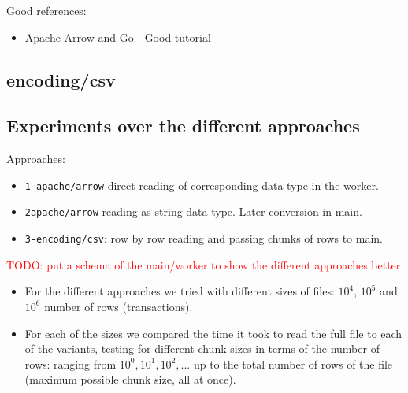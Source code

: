\documentclass{article}
\begin{document}
Good references:
\begin{itemize}
  \item \href{https://www.apachecon.com/acna2022/slides/01_Topol_Arrow_and_Go.pdf}{Apache Arrow and Go - Good tutorial}
\end{itemize}


\subsection{encoding/csv}

\subsection{Experiments over the different approaches}

Approaches:
\begin{itemize}
  \item \texttt{1-apache/arrow} direct reading of corresponding data type in the worker.
  \item \texttt{2apache/arrow} reading as string data type. Later conversion in main.
  \item \texttt{3-encoding/csv}: row by row reading and passing chunks of rows to main.
\end{itemize}

\textcolor{red}{TODO: put a schema of the main/worker to show the different approaches better}

\begin{itemize}
  \item For the different approaches we tried with different sizes of files: $10^4$, $10^5$ and $10^6$ number of rows (transactions).
  \item For each of the sizes we compared the time it took to read the full file to each of the variants, testing for different chunk sizes in terms of the number of rows: ranging from $10^0, 10^1, 10^2,...$ up to the total number of rows of the file (maximum possible chunk size, all at once).
\end{itemize}
\end{document}
